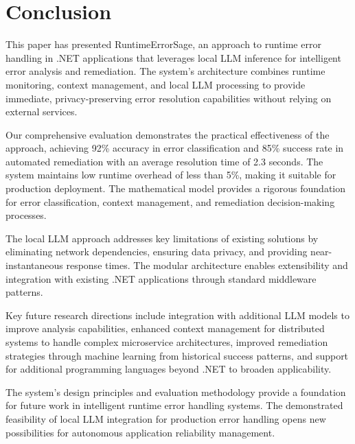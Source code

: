 \section{Conclusion}\label{sec:conclusion}
This paper has presented RuntimeErrorSage, an approach to runtime error handling in .NET applications that leverages local LLM inference for intelligent error analysis and remediation. The system's architecture combines runtime monitoring, context management, and local LLM processing to provide immediate, privacy-preserving error resolution capabilities without relying on external services.

Our comprehensive evaluation demonstrates the practical effectiveness of the approach, achieving 92\% accuracy in error classification and 85\% success rate in automated remediation with an average resolution time of 2.3 seconds. The system maintains low runtime overhead of less than 5\%, making it suitable for production deployment. The mathematical model provides a rigorous foundation for error classification, context management, and remediation decision-making processes.

The local LLM approach addresses key limitations of existing solutions by eliminating network dependencies, ensuring data privacy, and providing near-instantaneous response times. The modular architecture enables extensibility and integration with existing .NET applications through standard middleware patterns.

Key future research directions include integration with additional LLM models to improve analysis capabilities, enhanced context management for distributed systems to handle complex microservice architectures, improved remediation strategies through machine learning from historical success patterns, and support for additional programming languages beyond .NET to broaden applicability.

The system's design principles and evaluation methodology provide a foundation for future work in intelligent runtime error handling systems. The demonstrated feasibility of local LLM integration for production error handling opens new possibilities for autonomous application reliability management.
